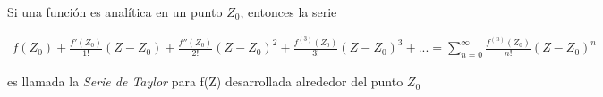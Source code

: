 Si una función es analítica en un punto $Z_0$, entonces la serie

\begin{align}
    f(Z_0) + \frac{f'(Z_0)}{1!}(Z-Z_0) + \frac{f''(Z_0)}{2!}(Z-Z_0)^2 +
        \frac{f^(3)(Z_0)}{3!}(Z-Z_0)^3 + ...
        = \sum_{n=0}^{\infty} \frac{f^{(n)}(Z_0)}{n!}(Z-Z_0)^n
\end{align}

es llamada la \textit{Serie de Taylor} para f(Z) desarrollada alrededor del punto $Z_0$